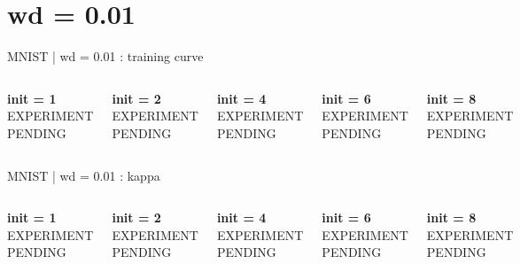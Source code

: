 \documentclass[aspectratio=169]{beamer}
\begin{document}
\section{wd = 0.01}
\begin{frame}{MNIST | wd = 0.01 : training curve}
\begin{columns}[T,onlytextwidth]

    \centering
\textbf{init = 1}\\[0.5em]
\vfill
{\Large EXPERIMENT PENDING}
\vfill

    \centering
\textbf{init = 2}\\[0.5em]
\vfill
{\Large EXPERIMENT PENDING}
\vfill

    \centering
\textbf{init = 4}\\[0.5em]
\vfill
{\Large EXPERIMENT PENDING}
\vfill

    \centering
\textbf{init = 6}\\[0.5em]
\vfill
{\Large EXPERIMENT PENDING}
\vfill

    \centering
\textbf{init = 8}\\[0.5em]
\vfill
{\Large EXPERIMENT PENDING}
\vfill
\end{columns}
\end{frame}
\begin{frame}{MNIST | wd = 0.01 : kappa}
\begin{columns}[T,onlytextwidth]

    \centering
\textbf{init = 1}\\[0.5em]
\vfill
{\Large EXPERIMENT PENDING}
\vfill

    \centering
\textbf{init = 2}\\[0.5em]
\vfill
{\Large EXPERIMENT PENDING}
\vfill

    \centering
\textbf{init = 4}\\[0.5em]
\vfill
{\Large EXPERIMENT PENDING}
\vfill

    \centering
\textbf{init = 6}\\[0.5em]
\vfill
{\Large EXPERIMENT PENDING}
\vfill

    \centering
\textbf{init = 8}\\[0.5em]
\vfill
{\Large EXPERIMENT PENDING}
\vfill
\end{columns}
\end{frame}
\end{document}

